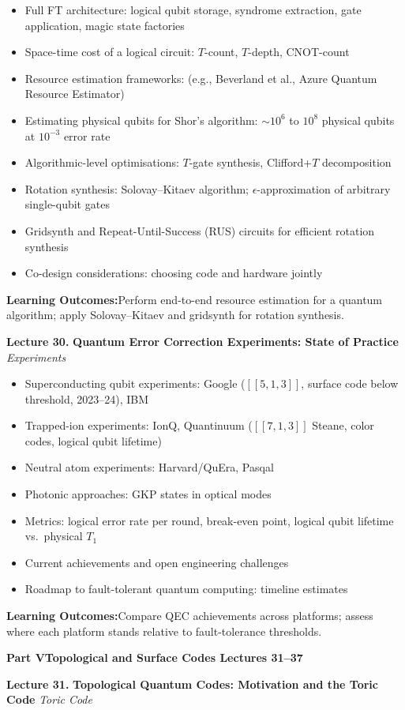 \documentclass[12pt,oneside]{article}
\newcommand{\parthead}[3]{%
  \vspace{16pt}
  \begin{tcolorbox}[
    enhanced,colback=partbg,colframe=partbg,
    arc=3pt,left=10pt,right=10pt,top=7pt,bottom=7pt,boxrule=0pt
  ]
    \color{white}\large\bfseries
    Part #1\enspace\textbar\enspace #2
    \hfill\normalfont\normalsize\color{white!80!partbg}Lectures #3
  \end{tcolorbox}
  \vspace{2pt}
}
\newcommand{\lecturetitle}[3]{%
  \vspace{10pt}
  \begin{tcolorbox}[
    enhanced,breakable,
    colback=highlight,colframe=accent,
    arc=2pt,left=10pt,right=8pt,top=7pt,bottom=7pt,boxrule=0.7pt
  ]
    \textbf{\color{accent}Lecture #1.\enspace}%
    {\color{primary}\bfseries #2}%
    \hfill{\small\color{warmgold}\textit{#3}}
  \end{tcolorbox}
  \vspace{-2pt}
}
\newcommand{\topics}[1]{%
  \begin{itemize}[leftmargin=1.5em,itemsep=1.5pt,topsep=3pt,parsep=0pt]
    #1
  \end{itemize}\vspace{2pt}
}
\newcommand{\T}[1]{\item #1}
\newcommand{\keybox}[1]{%
  \begin{tcolorbox}[
    enhanced,colback=lightgray,colframe=rulegray,
    arc=2pt,left=8pt,right=8pt,top=5pt,bottom=5pt,boxrule=0.4pt,
    fontupper=\small
  ]
    \textbf{\color{primary}Learning Outcomes:\enspace}#1
  \end{tcolorbox}\vspace{4pt}
}
\begin{document}
\topics{
  \T{Full FT architecture: logical qubit storage, syndrome extraction, gate application, magic state factories}
  \T{Space-time cost of a logical circuit: $T$-count, $T$-depth, CNOT-count}
  \T{Resource estimation frameworks: (e.g., Beverland et al., Azure Quantum Resource Estimator)}
  \T{Estimating physical qubits for Shor's algorithm: $\sim 10^6$ to $10^8$ physical qubits at $10^{-3}$ error rate}
  \T{Algorithmic-level optimisations: $T$-gate synthesis, Clifford+$T$ decomposition}
  \T{Rotation synthesis: Solovay--Kitaev algorithm; $\epsilon$-approximation of arbitrary single-qubit gates}
  \T{Gridsynth and Repeat-Until-Success (RUS) circuits for efficient rotation synthesis}
  \T{Co-design considerations: choosing code and hardware jointly}
}

\keybox{Perform end-to-end resource estimation for a quantum algorithm; apply Solovay--Kitaev and gridsynth for rotation synthesis.}

\lecturetitle{30}{Quantum Error Correction Experiments: State of Practice}{Experiments}

\topics{
  \T{Superconducting qubit experiments: Google ($[[5,1,3]]$, surface code below threshold, 2023--24), IBM}
  \T{Trapped-ion experiments: IonQ, Quantinuum ($[[7,1,3]]$ Steane, color codes, logical qubit lifetime)}
  \T{Neutral atom experiments: Harvard/QuEra, Pasqal}
  \T{Photonic approaches: GKP states in optical modes}
  \T{Metrics: logical error rate per round, break-even point, logical qubit lifetime vs.\ physical $T_1$}
  \T{Current achievements and open engineering challenges}
  \T{Roadmap to fault-tolerant quantum computing: timeline estimates}
}

\keybox{Compare QEC achievements across platforms; assess where each platform stands relative to fault-tolerance thresholds.}

\newpage


\parthead{V}{Topological and Surface Codes}{31--37}

\lecturetitle{31}{Topological Quantum Codes: Motivation and the Toric Code}{Toric Code}
\end{document}
